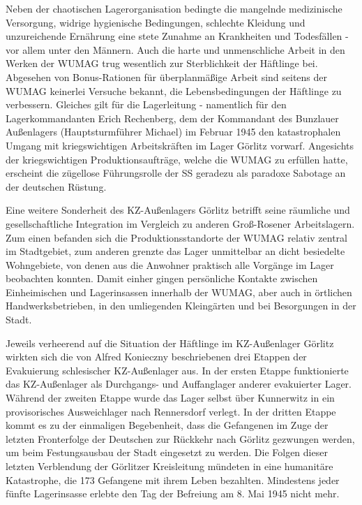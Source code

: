 Neben der chaotischen Lagerorganisation bedingte die mangelnde medizinische Versorgung, widrige hygienische Bedingungen, schlechte Kleidung und unzureichende Ernährung eine stete Zunahme an Krankheiten und Todesfällen - vor allem unter den Männern. Auch die harte und unmenschliche Arbeit in den Werken der WUMAG trug wesentlich zur Sterblichkeit der Häftlinge bei. Abgesehen von Bonus-Rationen für überplanmäßige Arbeit sind seitens der WUMAG keinerlei Versuche bekannt, die Lebensbedingungen der Häftlinge zu verbessern. Gleiches gilt für die Lagerleitung - namentlich für den Lagerkommandanten Erich Rechenberg, dem der Kommandant des Bunzlauer Außenlagers (Hauptsturmführer Michael) im Februar 1945 den katastrophalen Umgang mit kriegswichtigen Arbeitskräften im Lager Görlitz vorwarf. Angesichts der kriegswichtigen Produktionsaufträge, welche die WUMAG zu erfüllen hatte, erscheint die zügellose Führungsrolle der SS geradezu als paradoxe Sabotage an der deutschen Rüstung. 

Eine weitere Sonderheit des KZ-Außenlagers Görlitz betrifft seine räumliche und gesellschaftliche Integration im Vergleich zu anderen Groß-Rosener Arbeitslagern. Zum einen befanden sich die Produktionsstandorte der WUMAG relativ zentral im Stadtgebiet, zum anderen grenzte das Lager unmittelbar an dicht besiedelte Wohngebiete, von denen aus die Anwohner praktisch alle Vorgänge im Lager beobachten konnten. Damit einher gingen persönliche Kontakte zwischen Einheimischen und Lagerinsassen innerhalb der WUMAG, aber auch in örtlichen Handwerksbetrieben, in den umliegenden Kleingärten und bei Besorgungen in der Stadt.     

Jeweils verheerend auf die Situation der Häftlinge im KZ-Außenlager Görlitz wirkten sich die von Alfred Konieczny beschriebenen drei Etappen der Evakuierung schlesischer KZ-Außenlager aus. In der ersten Etappe funktionierte das KZ-Außenlager als Durchgangs- und Auffanglager anderer evakuierter Lager. Während der zweiten Etappe wurde das Lager selbst über Kunnerwitz in ein provisorisches Ausweichlager nach Rennersdorf verlegt.
In der dritten Etappe kommt es zu der einmaligen Begebenheit, dass die Gefangenen im Zuge der letzten Fronterfolge der Deutschen zur Rückkehr nach Görlitz gezwungen werden, um beim Festungsausbau der Stadt eingesetzt zu werden. Die Folgen dieser letzten Verblendung der Görlitzer Kreisleitung mündeten in eine humanitäre Katastrophe, die 173 Gefangene mit ihrem Leben bezahlten. Mindestens jeder fünfte Lagerinsasse erlebte den Tag der Befreiung am 8. Mai 1945 nicht mehr.

